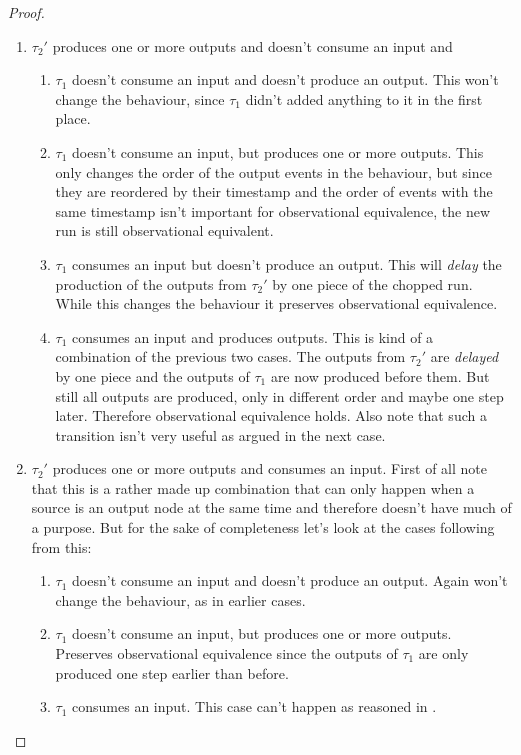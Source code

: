 \begin{proof}
\begin{enumerate}
      \item \(\tau_2'\) produces one or more outputs and doesn't consume an input and
        \begin{enumerate}
          \item \(\tau_1\) doesn't consume an input and doesn't produce an output. This won't change the behaviour, since \(\tau_1\) didn't added anything to it in the first place.
          \item \(\tau_1\) doesn't consume an input, but produces one or more outputs. This only changes the order of the output events in the behaviour, but since they are reordered by their timestamp and the order of events with the same timestamp isn't important for observational equivalence, the new run is still observational equivalent.
          \item \(\tau_1\) consumes an input but doesn't produce an output. This will \emph{delay} the production of the outputs from \(\tau_2'\) by one piece of the chopped run. While this changes the behaviour it preserves observational equivalence.
          \item \(\tau_1\) consumes an input and produces outputs. This is kind of a combination of the previous two cases. The outputs from \(\tau_2'\) are \emph{delayed} by one piece and the outputs of \(\tau_1\) are now produced before them. But still all outputs are produced, only in different order and maybe one step later. Therefore observational equivalence holds. Also note that such a transition isn't very useful as argued in the next case.
        \end{enumerate}
      \item \(\tau_2'\) produces one or more outputs and consumes an input. First of all note that this is a rather made up combination that can only happen when a source is an output node at the same time and therefore doesn't have much of a purpose. But for the sake of completeness let's look at the cases following from this:
        \begin{enumerate}
          \item \(\tau_1\) doesn't consume an input and doesn't produce an output. Again won't change the behaviour, as in earlier cases.
          \item\label{sec:behaviours:without_timing:greedy:non_greedy_2} \(\tau_1\) doesn't consume an input, but produces one or more outputs. Preserves observational equivalence since the outputs of \(\tau_1\) are only produced one step earlier than before.
          \item \(\tau_1\) consumes an input. This case can't happen as reasoned in .
        \end{enumerate}
    \end{enumerate}


\end{proof}
